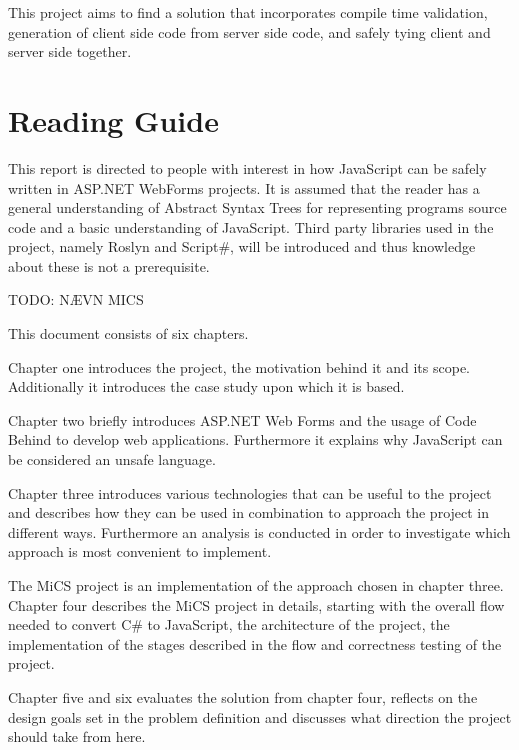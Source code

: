 	This project aims to find a solution that incorporates compile time validation, generation of client side code from server side code, and safely tying client and server side together.

\section{Reading Guide}

	This report is directed to people with interest in how JavaScript can be safely written in ASP.NET WebForms projects. It is assumed that the reader has a general understanding of Abstract Syntax Trees for representing programs source code and a basic understanding of JavaScript. Third party libraries used in the project, namely Roslyn and Script\#, will be introduced and thus knowledge about these is not a prerequisite.

	TODO: NÆVN MICS

	This document consists of six chapters.

	Chapter one introduces the project, the motivation behind it and its scope. Additionally it introduces the case study upon which it is based.

	Chapter two briefly introduces ASP.NET Web Forms and the usage of Code Behind to develop web applications. Furthermore it explains why JavaScript can be considered an unsafe language.

	Chapter three introduces various technologies that can be useful to the project and describes how they can be used in combination to approach the project in different ways. Furthermore an analysis is conducted in order to investigate which approach is most convenient to implement.

	The MiCS project is an implementation of the approach chosen in chapter three. Chapter four describes the MiCS project in details, starting with the overall flow needed to convert C\# to JavaScript, the architecture of the project, the implementation of the stages described in the flow and correctness testing of the project.

	Chapter five and six evaluates the solution from chapter four, reflects on the design goals set in the problem definition and discusses what direction the project should take from here.

